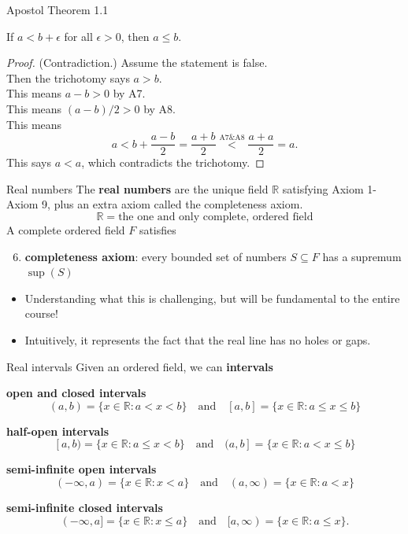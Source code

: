\documentclass{beamer}
\begin{document}
\begin{frame}{Apostol Theorem 1.1}
\begin{thm}
If $a < b + \epsilon$ for all $\epsilon > 0$, then $a\leq b$.
\end{thm}
\pause
\begin{proof}
(Contradiction.)  Assume the statement is false.\\
\pause
Then the trichotomy says $a > b$.\\
\pause
This means $a-b > 0$ by A7.\\
\pause
This means $(a-b)/2 > 0$ by A8.\\
\pause
This means
$$a < b + \frac{a-b}{2} = \frac{a+b}{2} \stackrel{\text{A7\&A8}}{<} \frac{a+a}{2} = a.$$
\pause
This says $a < a$, which contradicts the trichotomy.
\end{proof}
\end{frame}

\begin{frame}{Real numbers}
The \textbf{real numbers} are the unique field $\mathbb{R}$ satisfying Axiom 1-Axiom 9, plus an extra axiom called the completeness axiom.
$$\mathbb{R} = \text{the one and only complete, ordered field}$$
A complete ordered field $F$ satisfies
\begin{enumerate}[\text{A}1]
\setcounter{enumi}{5}
\pause
\item \textbf{completeness axiom}: every bounded set of numbers $S\subseteq F$ has a supremum $\sup(S)$
\end{enumerate}
\begin{itemize}
\pause
\item Understanding what this is challenging, but will be fundamental to the entire course!
\pause
\item Intuitively, it represents the fact that the real line has no holes or gaps.
\end{itemize}
\end{frame}


\begin{frame}{Real intervals}
Given an ordered field, we can \textbf{intervals}
\begin{itemize}
{\small
\pause
\item \textbf{open and closed intervals}
$$(a,b) = \{x\in \mathbb{R}: a < x < b\}
\quad\text{and}\quad
[a,b] = \{x\in \mathbb{R}: a \leq x \leq b\}$$
\pause
\item \textbf{half-open intervals}
$$
[a,b) = \{x\in \mathbb{R}: a \leq x < b\}
\quad\text{and}\quad
(a,b] = \{x\in \mathbb{R}: a < x \leq b\}
$$
\pause
\item \textbf{semi-infinite open intervals}
$$
(-\infty, a) = \{x\in\mathbb{R}: x < a\}
\quad\text{and}\quad
(a, \infty)  = \{x\in\mathbb{R}: a < x\}$$
\pause
\item \textbf{semi-infinite closed intervals}
$$
(-\infty, a] = \{x\in\mathbb{R}: x \leq a\}
\quad\text{and}\quad
[a, \infty)  = \{x\in\mathbb{R}: a \leq x\}.$$
}
\end{itemize}
\end{frame}
\end{document}
